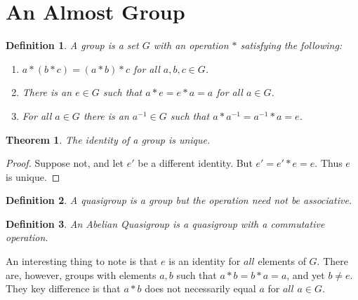 \documentclass[12pt,oneside]{book}
\theoremstyle{mystyle}
\newtheorem{theorem}{Theorem}[section]
\newtheorem{definition}{Definition}[section]
\begin{document}
\section{An Almost Group}
%
\begin{definition}
A group is a set $G$ with an operation $*$ satisfying the following:
\begin{enumerate}
\item $a*(b*c) = (a*b)*c$ for all $a,b,c\in G$.
\item There is an $e\in G$ such that $a*e=e*a = a$ for all $a\in G$.
\item For all $a\in G$ there is an $a^{-1}\in G$ such that $a*a^{-1}=a^{-1}*a = e$.
\end{enumerate}
\end{definition}

\begin{theorem}
The identity of a group is unique.
\end{theorem}
\begin{proof}
Suppose not, and let $e'$ be a different identity. But $e' = e'*e = e$. Thus $e$ is unique.
\end{proof}

\begin{definition}
A quasigroup is a group but the operation need not be associative.
\end{definition}

\begin{definition}
An Abelian Quasigroup is a quasigroup with a commutative operation.
\end{definition}

An interesting thing to note is that $e$ is an identity for $all$ elements of $G$. There are, however, groups with elements $a,b$ such that $a*b = b*a = a$, and yet $b\ne e$. They key difference is that $a*b$ does not necessarily equal $a$ for $all$ $a\in G$. 
\end{document}
